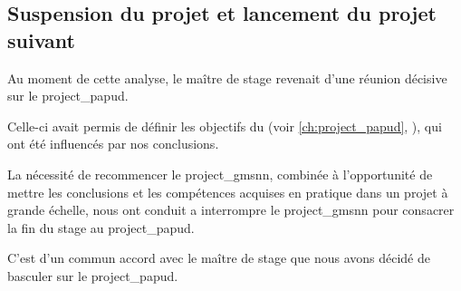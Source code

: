 \subsection{Suspension du projet et lancement du projet suivant}
Au moment de cette analyse, le maître de stage revenait d'une réunion décisive sur le \gls{project_papud}.

Celle-ci avait permis de définir les objectifs du  (voir \autoref{ch:project_papud}, ), qui ont été influencés par nos conclusions.

La nécessité de recommencer le \gls{project_gmsnn}, combinée à l'opportunité de mettre les conclusions et les compétences acquises en pratique dans un projet à grande échelle, nous ont conduit a interrompre le \gls{project_gmsnn} pour consacrer la fin du stage au \gls{project_papud}.

C'est d'un commun accord avec le maître de stage que nous avons décidé de basculer sur le \gls{project_papud}.